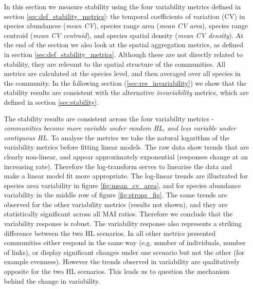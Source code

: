 In this section we measure stability using the four variability metrics defined in section \ref{sec:def_stability_metrics}: the temporal coefficients of variation (CV) in species abundances (\emph{mean CV}), species range area (\emph{mean CV area}), species range centroid (\emph{mean CV centroid}), and species spatial density (\emph{mean CV density}). At the end of the section we also look at the spatial aggregation metrics, as defined in section \ref{sec:def_stability_metrics}. Although these are not directly related to stability, they are relevant to the spatial structure of the communities. All metrics are calculated at the species level, and then averaged over all species in the community. In the following section (\ref{sec:res_invariability}) we show that the stability results are consistent with the alternative \emph{invariability} metrics, which are defined in section \ref{sec:stability}.

The stability results are consistent across the four variability metrics - \emph{communities become more variable under random HL, and less variable under contiguous HL}. To analyse the metrics we take the natural logarithm of the variability metrics before fitting linear models. The raw data show trends that are clearly non-linear, and appear approximately exponential (responses change at an increasing rate). Therefore the log-transform serves to linearise the data and make a linear model fit more appropriate. The log-linear trends are illustrated for species area variability in figure \ref{fig:mean_cv_area}, and for species abundance variability in the middle row of figure \ref{fig:strong_fig}. The same trends are observed for the other variability metrics (results not shown), and they are statistically significant across all MAI ratios. Therefore we conclude that the variability response is robust. The variability response also represents a striking difference between the two HL scenarios. In all other metrics presented communities either respond in the same way (e.g. number of individuals, number of links), or display significant changes under one scenario but not the other (for example evenness). However the trends observed in variability are qualitatively opposite for the two HL scenarios. This leads us to question the mechanism behind the change in variability.


